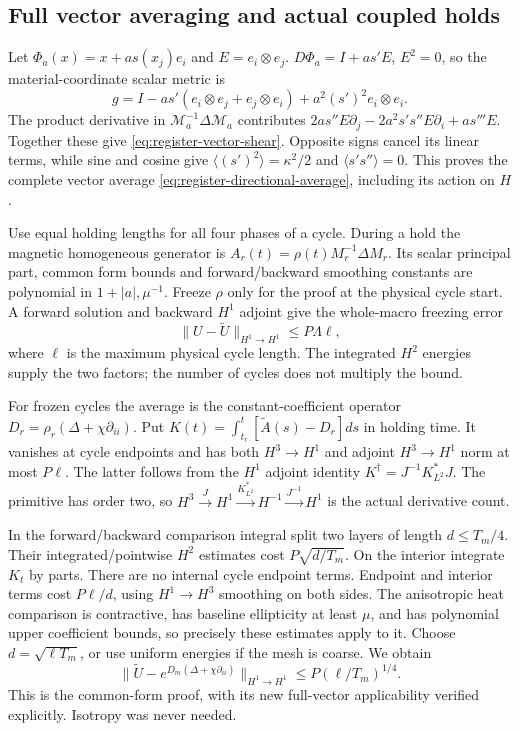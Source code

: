 \documentclass[11pt,a4paper]{amsart}
\theoremstyle{definition}
\theoremstyle{remark}
\numberwithin{equation}{section}
\newcommand{\Mcal}{\mathcal M}
\newcommand{\norm}[1]{\lVert #1\rVert}
\begin{document}
\subsection{Full vector averaging and actual coupled holds}
Let $\Phi_a(x)=x+as(x_j)e_i$ and $E=e_i\otimes e_j$.
$D\Phi_a=I+as'E$, $E^2=0$, so the material-coordinate scalar metric is
\[
 g=I-as'(e_i\otimes e_j+e_j\otimes e_i)
                  +a^2(s')^2e_i\otimes e_i.
\]
The product derivative in $\Mcal_a^{-1}\Delta\Mcal_a$ contributes
$2as''E\partial_j-2a^2s's''E\partial_i+as'''E$.
Together these give \eqref{eq:register-vector-shear}.  Opposite signs
cancel its linear terms, while sine and cosine give
$\langle(s')^2\rangle=\kappa^2/2$ and
$\langle s's''\rangle=0$.  This proves the complete vector average
\eqref{eq:register-directional-average}, including its action on $H$.

Use equal holding lengths for all four phases of a cycle.  During a
hold the magnetic homogeneous generator is
$A_r(t)=\rho(t)M_r^{-1}\Delta M_r$.  Its scalar principal part, common
form bounds and forward/backward smoothing constants are polynomial in
$1+|a|,\mu^{-1}$.  Freeze $\rho$ only for the proof at the physical
cycle start.  A forward solution and backward $H^1$ adjoint give the
whole-macro freezing error
\begin{equation}\label{eq:register-freezing-error}
 \norm{U-\widetilde U}_{H^1\to H^1}\le P\Lambda\ell,
\end{equation}
where $\ell$ is the maximum physical cycle length.  The integrated
$H^2$ energies supply the two factors; the number of cycles does not
multiply the bound.

For frozen cycles the average is the constant-coefficient operator
$D_r=\rho_r(\Delta+\chi\partial_{ii})$.  Put
$K(t)=\int_{t_r}^t[\widetilde A(s)-D_r]ds$ in holding time.  It vanishes
at cycle endpoints and has both
$H^3\to H^1$ and adjoint $H^3\to H^1$ norm at most $P\ell$.
The latter follows from the $H^1$ adjoint identity
$K^\dagger=J^{-1}K_{L^2}^*J$.  The primitive has order two, so
$H^3\xrightarrow J H^1\xrightarrow{K_{L^2}^*}H^{-1}
\xrightarrow{J^{-1}}H^1$ is the actual derivative count.

In the forward/backward comparison integral split two layers of length
$d\le T_m/4$.  Their integrated/pointwise $H^2$ estimates cost
$P\sqrt{d/T_m}$.  On the interior integrate $K_t$ by parts.
There are no internal cycle endpoint terms.  Endpoint and interior
terms cost $P\ell/d$, using $H^1\to H^3$ smoothing on both sides.
The anisotropic heat comparison is contractive, has baseline ellipticity
at least $\mu$, and has polynomial upper coefficient bounds, so precisely
these estimates apply to it.  Choose $d=\sqrt{\ell T_m}$, or use uniform
energies if the mesh is coarse.  We obtain
\begin{equation}\label{eq:register-form-average-error}
 \norm{\widetilde U-e^{D_m(\Delta+\chi\partial_{ii})}}_{H^1\to H^1}
       \le P(\ell/T_m)^{1/4}.
\end{equation}
This is the common-form proof, with its new full-vector applicability
verified explicitly.  Isotropy was never needed.
\end{document}
